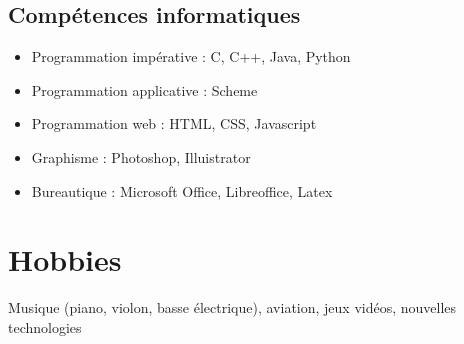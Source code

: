 \documentclass[a4paper]{moderncv}
\begin{document}
    \subsection{Compétences informatiques}

      \begin{itemize}[label=\textbullet]
        \item{Programmation impérative : C, C++, Java, Python}
        \item{Programmation applicative : Scheme}
        \item{Programmation web : HTML, CSS, Javascript}
        \item{Graphisme : Photoshop, Illuistrator}
        \item{Bureautique : Microsoft Office, Libreoffice, Latex}
      \end{itemize}

  \section{Hobbies}
    Musique (piano, violon, basse électrique), aviation, jeux vidéos, nouvelles technologies
\end{document}
